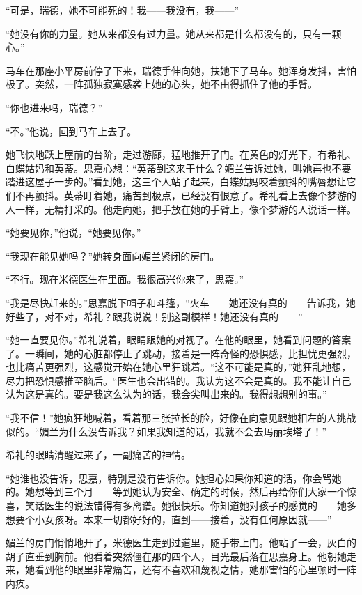 \par “可是，瑞德，她不可能死的！我——我没有，我——”
\par “她没有你的力量。她从来都没有过力量。她从来都是什么都没有的，只有一颗心。”
\par 马车在那座小平房前停了下来，瑞德手伸向她，扶她下了马车。她浑身发抖，害怕极了。突然，一阵孤独寂寞感袭上她的心头，她不由得抓住了他的手臂。
\par “你也进来吗，瑞德？”
\par “不。”他说，回到马车上去了。
\par 她飞快地跃上屋前的台阶，走过游廊，猛地推开了门。在黄色的灯光下，有希礼、白蝶姑妈和英蒂。思嘉心想：“英蒂到这来干什么？媚兰告诉过她，叫她再也不要踏进这屋子一步的。”看到她，这三个人站了起来，白蝶姑妈咬着颤抖的嘴唇想让它们不再颤抖。英蒂盯着她，痛苦到极点，已经没有恨意了。希礼看上去像个梦游的人一样，无精打采的。他走向她，把手放在她的手臂上，像个梦游的人说话一样。
\par “她要见你，”他说，“她要见你。”
\par “我现在能见她吗？”她转身面向媚兰紧闭的房门。
\par “不行。现在米德医生在里面。我很高兴你来了，思嘉。”
\par “我是尽快赶来的。”思嘉脱下帽子和斗篷，“火车——她还没有真的——告诉我，她好些了，对不对，希礼？跟我说说！别这副模样！她还没有真的——”
\par “她一直要见你。”希礼说着，眼睛跟她的对视了。在他的眼里，她看到问题的答案了。一瞬间，她的心脏都停止了跳动，接着是一阵奇怪的恐惧感，比担忧更强烈，也比痛苦更强烈，这感觉开始在她心里狂跳着。“这不可能是真的，”她狂乱地想，尽力把恐惧感推至脑后。“医生也会出错的。我认为这不会是真的。我不能让自己认为这是真的。要是我这么认为的话，我会尖叫出来的。我得想想别的事。”
\par “我不信！”她疯狂地喊着，看着那三张拉长的脸，好像在向意见跟她相左的人挑战似的。“媚兰为什么没告诉我？如果我知道的话，我就不会去玛丽埃塔了！”
\par 希礼的眼睛清醒过来了，一副痛苦的神情。
\par “她谁也没告诉，思嘉，特别是没有告诉你。她担心如果你知道的话，你会骂她的。她想等到三个月——等到她认为安全、确定的时候，然后再给你们大家一个惊喜，笑话医生的说法错得有多离谱。她很快乐。你知道她对孩子的感觉的——她多想要个小女孩呀。本来一切都好好的，直到——接着，没有任何原因就——”
\par 媚兰的房门悄悄地开了，米德医生走到过道里，随手带上门。他站了一会，灰白的胡子直垂到胸前。他看着突然僵在那的四个人，目光最后落在思嘉身上。他朝她走来，她看到他的眼里非常痛苦，还有不喜欢和蔑视之情，她那害怕的心里顿时一阵内疚。
